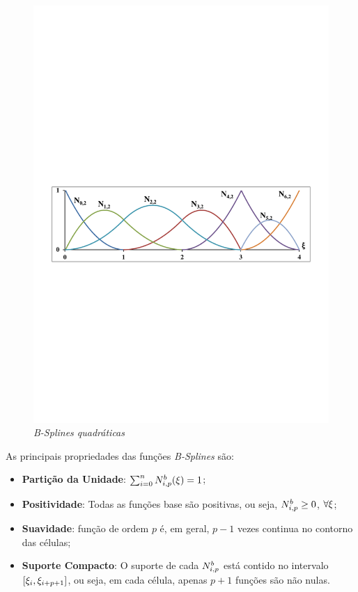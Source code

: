 \documentclass[tese_patricia]{subfiles}
\begin{document}
\begin{figure}[htb!]
	\centering 
	\includegraphics[scale=0.7,trim=1.5cm 11.5cm 1.5cm 13cm, clip=true]{Imagens/Cap3/bspline_funcoes.pdf}	
	\caption{\textit{B-Splines quadráticas}}
	\label{fig:bspline_funcoes}
\end{figure}

As principais propriedades das funções \textit{B-Splines} são:

\begin{itemize}
	\item \textbf{Partição da Unidade}: $\sum_{i=0}^{n}N^b_{i,p}(\xi)=1 $;
	\item \textbf{Positividade}: Todas as funções base são positivas, ou seja, $N^b_{i,p}\geq0$, $\forall\xi$;
	\item \textbf{Suavidade}: função de ordem $p$ é, em geral, $p-1$ vezes continua no contorno das células;
	\item \textbf{Suporte Compacto}: O suporte de cada $N^b_{i,p}$ está contido no intervalo $\left[\xi_i,\xi_{i+p+1}\right]$, ou seja, em cada célula, apenas $p+1$ funções são não nulas. %
\end{itemize}
\end{document}
